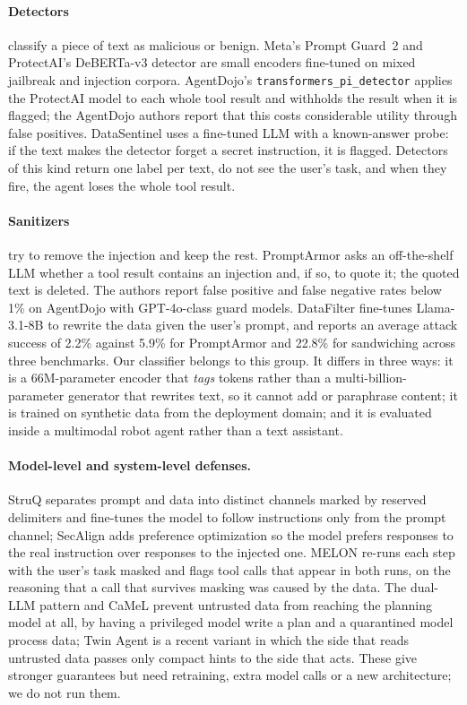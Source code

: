 \documentclass{article}
\newcommand{\code}[1]{\texttt{#1}}
\begin{document}
\paragraph{Detectors} classify a piece of text as malicious or benign. Meta's Prompt Guard~2
\cite{promptguard} and ProtectAI's DeBERTa-v3 detector \cite{protectai} are small encoders fine-tuned
on mixed jailbreak and injection corpora. AgentDojo's \code{transformers\_pi\_detector} applies the
ProtectAI model to each whole tool result and withholds the result when it is flagged; the AgentDojo
authors report that this costs considerable utility through false positives. DataSentinel
\cite{datasentinel} uses a fine-tuned LLM with a known-answer probe: if the text makes the detector
forget a secret instruction, it is flagged. Detectors of this kind return one label per text, do not
see the user's task, and when they fire, the agent loses the whole tool result.

\paragraph{Sanitizers} try to remove the injection and keep the rest. PromptArmor \cite{promptarmor}
asks an off-the-shelf LLM whether a tool result contains an injection and, if so, to quote it; the
quoted text is deleted. The authors report false positive and false negative rates below 1\% on
AgentDojo with GPT-4o-class guard models. DataFilter \cite{datafilter} fine-tunes Llama-3.1-8B to
rewrite the data given the user's prompt, and reports an average attack success of 2.2\% against
5.9\% for PromptArmor and 22.8\% for sandwiching across three benchmarks. Our classifier belongs to
this group. It differs in three ways: it is a 66M-parameter encoder that \emph{tags} tokens rather
than a multi-billion-parameter generator that rewrites text, so it cannot add or paraphrase content;
it is trained on synthetic data from the deployment domain; and it is evaluated inside a multimodal
robot agent rather than a text assistant.

\paragraph{Model-level and system-level defenses.} StruQ \cite{struq} separates prompt and data into
distinct channels marked by reserved delimiters and fine-tunes the model to follow instructions only
from the prompt channel; SecAlign \cite{secalign} adds preference optimization so the model prefers
responses to the real instruction over responses to the injected one. MELON \cite{melon} re-runs each
step with the user's task masked and flags tool calls that appear in both runs, on the reasoning that
a call that survives masking was caused by the data. The dual-LLM pattern \cite{dualllm} and CaMeL
\cite{camel} prevent untrusted data from reaching the planning model at all, by having a privileged
model write a plan and a quarantined model process data; Twin Agent \cite{twinagent} is a recent
variant in which the side that reads untrusted data passes only compact hints to the side that acts.
These give stronger guarantees but need retraining, extra model calls or a new architecture; we do
not run them.
\end{document}
